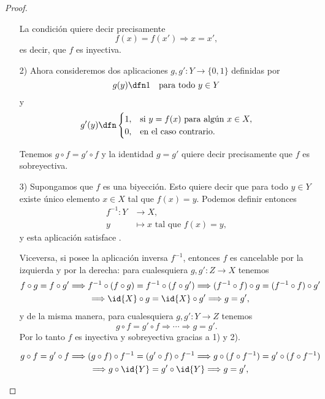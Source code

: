 \begin{proposicion}
\begin{proof}
\begin{enumerate}
      La condición  quiere decir precisamente
      $$f (x) = f (x') \Longrightarrow x = x',$$
      es decir, que $f$ es inyectiva.

    \item[2)] Ahora consideremos dos aplicaciones $g, g'\colon Y\to \{ 0, 1 \}$
      definidas por
      $$g (y) \dfn 1 \quad \text{para todo }y\in Y$$
      y
      \[ g' (y) \dfn \begin{cases}
          1, & \text{si } y = f(x) \text{ para algún }x\in X, \\
          0, & \text{en el caso contrario}.
        \end{cases} \]

      Tenemos $g\circ f = g'\circ f$ y la identidad $g = g'$ quiere decir
      precisamente que $f$ es sobreyectiva.

    \item[3)] Supongamos que $f$ es una biyección. Esto quiere decir que para
      todo $y\in Y$ existe único elemento $x\in X$ tal que $f (x) = y$. Podemos
      definir entonces
      \begin{align*}
        f^{-1}\colon Y & \to X,\\
        y & \mapsto x \text{ tal que }f (x) = y,
      \end{align*}
      y esta aplicación satisface .

      Viceversa, si posee la aplicación inversa $f^{-1}$, entonces $f$ es
      cancelable por la izquierda y por la derecha: para cualesquiera
      $g,g'\colon Z\to X$ tenemos
      \begin{multline*}
        f\circ g = f\circ g' \Longrightarrow
        f^{-1}\circ (f\circ g) = f^{-1}\circ (f\circ g') \Longrightarrow
        (f^{-1}\circ f)\circ g = (f^{-1}\circ f)\circ g' \\
        \Longrightarrow \id{X}\circ g = \id{X}\circ g' \Longrightarrow
        g = g',\\
      \end{multline*}
      y de la misma manera, para cualesquiera $g,g'\colon Y\to Z$ tenemos
      $$g\circ f = g'\circ f \Longrightarrow \cdots \Longrightarrow g = g'.$$
      Por lo tanto $f$ es inyectiva y sobreyectiva gracias a 1) y 2). \qedhere

      \ifwordy
      \begin{shaded}
        \begin{multline*}
          g\circ f = g'\circ f \Longrightarrow
          (g\circ f)\circ f^{-1} = (g'\circ f)\circ f^{-1} \Longrightarrow
          g\circ (f\circ f^{-1}) = g'\circ (f\circ f^{-1}) \\
          \Longrightarrow g\circ \id{Y} = g'\circ \id{Y} \Longrightarrow g = g',
        \end{multline*}
      \end{shaded}
      \fi
    \end{enumerate}
  \end{proof}
\end{proposicion}

